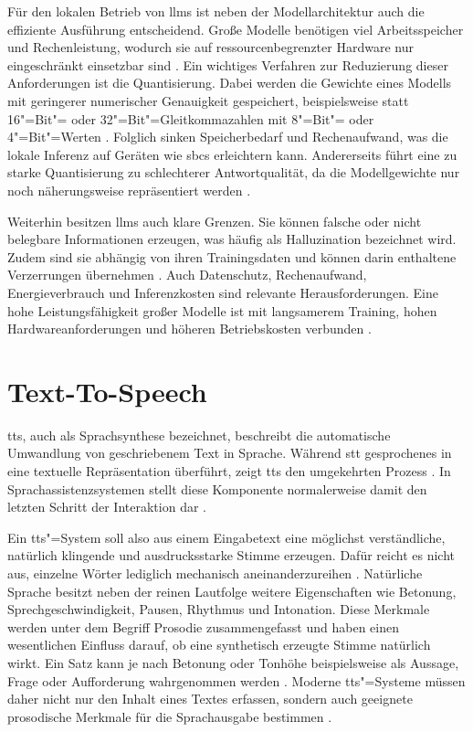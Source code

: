 Für den lokalen Betrieb von \glspl{llm} ist neben der Modellarchitektur auch die effiziente Ausführung entscheidend. Große Modelle benötigen viel Arbeitsspeicher und Rechenleistung, wodurch sie auf ressourcenbegrenzter Hardware nur eingeschränkt einsetzbar sind \autocite{comprehensiveOverviewLLM}. Ein wichtiges Verfahren zur Reduzierung dieser Anforderungen ist die Quantisierung. Dabei werden die Gewichte eines Modells mit geringerer numerischer Genauigkeit gespeichert, beispielsweise statt 16"=Bit"= oder 32"=Bit"=Gleitkommazahlen mit 8"=Bit"= oder 4"=Bit"=Werten \autocite{comprehensiveOverviewLLM,qwen2TechnicalReport}. Folglich sinken Speicherbedarf und Rechenaufwand, was die lokale Inferenz auf Geräten wie  \glspl{sbc} erleichtern kann. Andererseits führt eine zu starke Quantisierung zu schlechterer Antwortqualität, da die Modellgewichte nur noch näherungsweise repräsentiert werden \autocite{qwen2TechnicalReport}.

Weiterhin besitzen \glspl{llm} auch klare Grenzen. Sie können falsche oder nicht belegbare Informationen erzeugen, was häufig als Halluzination bezeichnet wird. Zudem sind sie abhängig von ihren Trainingsdaten und können darin enthaltene Verzerrungen übernehmen \autocite{comprehensiveOverviewLLM}. Auch Datenschutz, Rechenaufwand, Energieverbrauch und Inferenzkosten sind relevante Herausforderungen. Eine hohe Leistungsfähigkeit großer Modelle ist mit langsamerem Training, hohen Hardwareanforderungen und höheren Betriebskosten verbunden \autocite{comprehensiveOverviewLLM}.


\section{Text-To-Speech}
\label{sec:Text-to-Speech}
\gls{tts}, auch als Sprachsynthese bezeichnet, beschreibt die automatische Umwandlung von geschriebenem Text in Sprache. Während \gls{stt} gesprochenes in eine textuelle Repräsentation überführt, zeigt \gls{tts} den umgekehrten Prozess \autocite{speechtoTextTexttoSpeechRecognition}. In Sprachassistenzsystemen stellt diese Komponente normalerweise damit den letzten Schritt der Interaktion dar \autocite{voiceassistantIntroduction,EDPBLeitlinienSprachassistenzsysteme}.

Ein  \gls{tts}"=System soll also aus einem Eingabetext eine möglichst verständliche, natürlich klingende und ausdrucksstarke Stimme erzeugen. Dafür reicht es nicht aus, einzelne Wörter lediglich mechanisch aneinanderzureihen \autocite{speechtoTextTexttoSpeechRecognition}. Natürliche Sprache besitzt neben der reinen Lautfolge weitere Eigenschaften wie Betonung, Sprechgeschwindigkeit, Pausen, Rhythmus und Intonation. Diese Merkmale werden unter dem Begriff Prosodie zusammengefasst und haben einen wesentlichen Einfluss darauf, ob eine synthetisch erzeugte Stimme natürlich wirkt. Ein Satz kann je nach Betonung oder Tonhöhe beispielsweise als Aussage, Frage oder Aufforderung wahrgenommen werden \autocite{speechtoTextTexttoSpeechRecognition}. Moderne \gls{tts}"=Systeme müssen daher nicht nur den Inhalt eines Textes erfassen, sondern auch geeignete prosodische Merkmale für die Sprachausgabe bestimmen \autocite{speechtoTextTexttoSpeechRecognition,EDPBLeitlinienSprachassistenzsysteme}.

